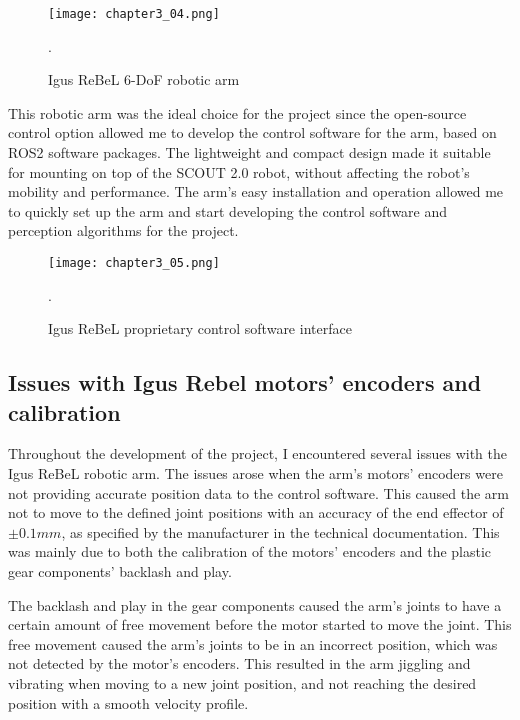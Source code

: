 \begin{figure}[ht]
    \centering
    \texttt{[image: chapter3\_04.png]}
    \captionsetup{width=1\linewidth}
    \caption{Igus ReBeL 6-DoF robotic arm}.
    \label{fig:c3_img04}
\end{figure}

This robotic arm was the ideal choice for the project since the open-source control option allowed me to develop
the control software for the arm, based on ROS2 software packages. The lightweight and compact design made it suitable
for mounting on top of the SCOUT 2.0 robot, without affecting the robot's mobility and performance. 
The arm's easy installation and operation allowed me to quickly set up the arm and start developing the control software
and perception algorithms for the project.

\begin{figure}[ht]
    \centering
    \texttt{[image: chapter3\_05.png]}
    \captionsetup{width=1\linewidth}
    \caption{Igus ReBeL proprietary control software interface}.
    \label{fig:c3_img05}
\end{figure}

\subsection*{Issues with Igus Rebel motors' encoders and calibration}

Throughout the development of the project, I encountered several issues with the Igus ReBeL robotic arm.
The issues arose when the arm's motors' encoders were not providing accurate position data to the control software.
This caused the arm not to move to the defined joint positions with an accuracy of the end effector of $\pm 0.1mm$,
as specified by the manufacturer in the technical documentation.
This was mainly due to both the calibration of the motors' encoders and the plastic gear components' backlash and play.

The backlash and play in the gear components caused the arm's joints to have a certain amount of free movement before the motor
started to move the joint. This free movement caused the arm's joints to be in an incorrect position, which was not detected
by the motor's encoders. This resulted in the arm jiggling and vibrating when moving to a new joint position, and not reaching
the desired position with a smooth velocity profile.

